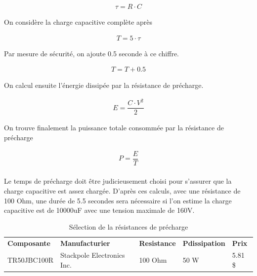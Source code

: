 		\begin{align}
			\tau =R \cdot C
			\label{eq:Constante de temps}
		\end{align}
				
		On considère la charge capacitive complète après	
	 
		\begin{align}
			T = 5 \cdot \tau
			\label{eq:CapaciteCharge}
		\end{align}
		
		Par mesure de sécurité, on ajoute 0.5 seconde à ce chiffre.
		
		\begin{align}
			T = T + 0.5
			\label{eq:Tempsdecharge}
		\end{align}		
				
		On calcul ensuite l'énergie dissipée par la résistance de précharge.
		
		\begin{align}
			E = \dfrac{C \cdot V^2}{2}
			\label{eq:EnergiePrecharge}
		\end{align}
		
		On trouve finalement la puissance totale consommée par la résistance de précharge
	
		\begin{align}
			P = \dfrac{E}{T}
			\label{eq:PuissancePrecharge}
		\end{align}	
			
		\paragraph*{}		
		Le temps de précharge doit être judicieusement choisi pour s'assurer que la charge capacitive est assez chargée. D'après ces calculs, avec une résistance de 100 Ohm, une durée de 5.5 secondes sera nécessaire si l'on estime la charge capacitive est de 10000uF avec une tension maximale de 160V. 
				
		\begin{table}[H]
			\centering
			\caption{Sélection de la résistances de précharge}
			\label{ResistancePrecharge}
			\begin{tabular}{|p{3cm}|p{5cm}|p{2cm}|p{2cm}|p{1.5cm}|}
				\hline
				\textbf{Composante} & \textbf{Manufacturier} & \textbf{Resistance} & \textbf{Pdissipation} & \textbf{Prix}
				\\ \hhline{|=|=|=|=|=|}
				TR50JBC100R & Stackpole Electronics Inc. & 100 Ohm & 50 W & 5.81 \$ \\ \hline		
			\end{tabular}
		\end{table}

